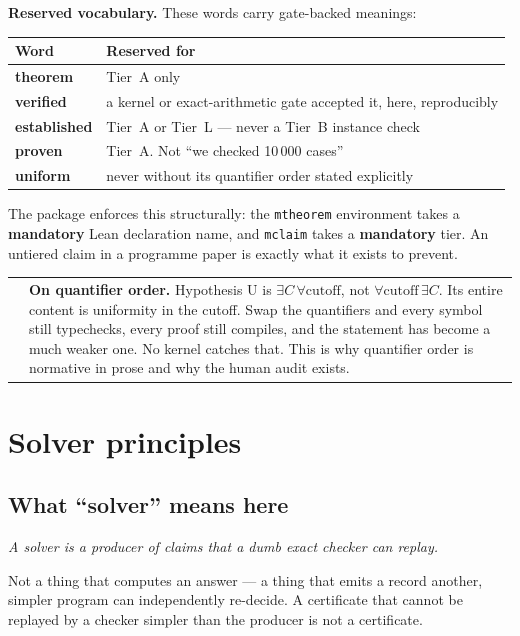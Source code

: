 \documentclass[11pt,a4paper]{article}
\makeatletter
\newcommand{\caveat}[1]{%
  \par\vspace{0.6em}\noindent
  \begin{tabular}{@{}p{0.4em}@{\hspace{0.8em}}p{\dimexpr\linewidth-2.2em\relax}@{}}
  \textcolor{rulegray}{\rule{2pt}{\baselineskip}} & \small #1
  \end{tabular}\par\vspace{0.6em}}
\makeatother
\begin{document}
\textbf{Reserved vocabulary.} These words carry gate-backed meanings:

\begin{center}\small
\begin{tabular}{@{}lp{9.5cm}@{}}
\toprule
Word & Reserved for \\
\midrule
\textbf{theorem}     & Tier~A only \\
\textbf{verified}    & a kernel or exact-arithmetic gate accepted it, here, reproducibly \\
\textbf{established} & Tier~A or Tier~L — never a Tier~B instance check \\
\textbf{proven}      & Tier~A. Not ``we checked 10\,000 cases'' \\
\textbf{uniform}     & never without its quantifier order stated explicitly \\
\bottomrule
\end{tabular}
\end{center}

The package enforces this structurally: the \texttt{mtheorem} environment takes a
\textbf{mandatory} Lean declaration name, and \texttt{mclaim} takes a \textbf{mandatory} tier. An
untiered claim in a programme paper is exactly what it exists to prevent.

\caveat{\textbf{On quantifier order.} Hypothesis U is $\exists C\,\forall\text{cutoff}$, not
$\forall\text{cutoff}\,\exists C$. Its entire content is uniformity in the cutoff. Swap the
quantifiers and every symbol still typechecks, every proof still compiles, and the statement has
become a much weaker one. No kernel catches that. This is why quantifier order is normative in
prose and why the human audit exists.}

\section{Solver principles}

\subsection{What ``solver'' means here}

\begin{center}\itshape
A solver is a producer of claims that a dumb exact checker can replay.
\end{center}

Not a thing that computes an answer — a thing that emits a record another, simpler program can
independently re-decide. A certificate that cannot be replayed by a checker simpler than the
producer is not a certificate.
\end{document}
